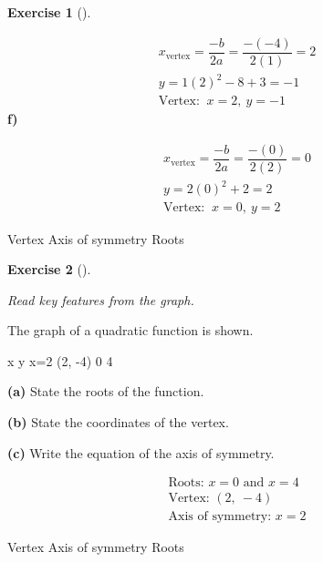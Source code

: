 \documentclass[
  letterpaper,
  DIV=11,
  numbers=noendperiod]{scrreprt}
\theoremstyle{definition}
\newtheorem{exercise}{Exercise}[chapter]
\theoremstyle{remark}
\begin{document}
\begin{exercise}[]
\begin{tcolorbox}
\[
\begin{aligned}
x_{\text{vertex}} = \dfrac{-b}{2a} = \dfrac{-(-4)}{2(1)} = 2 \\[4pt] y = 1(2)^2 - 8 + 3 = -1 \\[4pt] \text{Vertex: }\ x=2,\ y=-1
\end{aligned}
\] \textbf{f)}

\[
\begin{aligned}
x_{\text{vertex}} = \dfrac{-b}{2a} = \dfrac{-(0)}{2(2)} = 0 \\[4pt] y = 2(0)^2  + 2 = 2 \\[4pt] \text{Vertex: }\ x=0,\ y=2
\end{aligned}
\]

\end{tcolorbox}

{Vertex} {Axis of symmetry} {Roots}

\end{exercise}

\begin{exercise}[]\protect\hypertarget{exr-u7-27}{}\label{exr-u7-27}

\emph{Read key features from the graph.}

The graph of a quadratic function is shown.

x y x=2 (2, -4) 0 4

\textbf{(a)} State the roots of the function.

\textbf{(b)} State the coordinates of the vertex.

\textbf{(c)} Write the equation of the axis of symmetry.

\begin{tcolorbox}[enhanced jigsaw, opacitybacktitle=0.6, coltitle=black, arc=.35mm, colframe=quarto-callout-tip-color-frame, colback=white, bottomrule=.15mm, left=2mm, colbacktitle=quarto-callout-tip-color!10!white, titlerule=0mm, opacityback=0, title=\textcolor{quarto-callout-tip-color}{\faLightbulb}\hspace{0.5em}{🔍 View Solution}, leftrule=.75mm, breakable, rightrule=.15mm, bottomtitle=1mm, toptitle=1mm, toprule=.15mm]

\[
\begin{aligned}
\text{Roots: } x = 0 \text{ and } x = 4 \\[4pt] \text{Vertex: } (2,\ -4) \\[4pt] \text{Axis of symmetry: } x = 2
\end{aligned}
\]

\end{tcolorbox}

{Vertex} {Axis of symmetry} {Roots}

\end{exercise}
\end{document}
